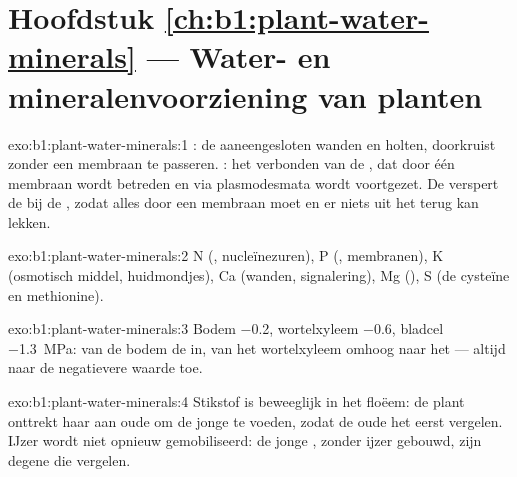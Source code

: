 \section*{Hoofdstuk \ref{ch:b1:plant-water-minerals} --- Water- en mineralenvoorziening van planten}

\begin{solution}{exo:b1:plant-water-minerals:1}
: de aaneengesloten wanden en holten, doorkruist zonder een
membraan te passeren. : het verbonden  van de , dat
door één membraan wordt betreden en via plasmodesmata wordt voortgezet. De
 verspert de  bij de , zodat alles door
een membraan moet en er niets uit het  terug kan lekken.
\end{solution}

\begin{solution}{exo:b1:plant-water-minerals:2}
N (, nucleïnezuren), P (, membranen), K (osmotisch
middel, huidmondjes), Ca (wanden, signalering), Mg (), S (de
 cysteïne en methionine).
\end{solution}

\begin{solution}{exo:b1:plant-water-minerals:3}
Bodem \qty{-0.2}{}, wortelxyleem \qty{-0.6}{}, bladcel \qty{-1.3}{MPa}: van
de bodem de  in, van het wortelxyleem omhoog naar het  --- altijd
naar de negatievere waarde toe.
\end{solution}

\begin{solution}{exo:b1:plant-water-minerals:4}
Stikstof is beweeglijk in het floëem: de plant onttrekt haar aan oude
 om de jonge te voeden, zodat de oude  het eerst vergelen.
IJzer wordt niet opnieuw gemobiliseerd: de jonge , zonder ijzer
gebouwd, zijn degene die vergelen.
\end{solution}

